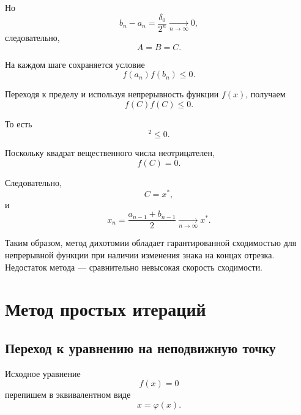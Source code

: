 \documentclass[../final.tex]{subfiles}
\begin{document}
Но
%
\begin{equation*}
    b_n-a_n
    =
    \frac{\delta_0}{2^n}
    \underset{n\to\infty}{\longrightarrow}
    0,
\end{equation*}
%
следовательно,
%
\begin{equation*}
    A=B=C.
\end{equation*}

На каждом шаге сохраняется условие
%
\begin{equation*}
    f(a_n)f(b_n)\leq0.
\end{equation*}

Переходя к пределу и используя непрерывность функции $f(x)$,
получаем
%
\begin{equation*}
    f(C)f(C)\leq0.
\end{equation*}

То есть
%
\begin{equation*}
    [f(C)]^2\leq0.
\end{equation*}

Поскольку квадрат вещественного числа неотрицателен,
%
\begin{equation*}
    f(C)=0.
\end{equation*}

Следовательно,
%
\begin{equation*}
    C=x^*,
\end{equation*}
%
и
%
\begin{equation*}
    x_n
    =
    \frac{a_{n-1}+b_{n-1}}{2}
    \underset{n\to\infty}{\longrightarrow}
    x^*.
\end{equation*}

Таким образом, метод дихотомии обладает гарантированной сходимостью
для непрерывной функции при наличии изменения знака на концах
отрезка. Недостаток метода --- сравнительно невысокая скорость
сходимости.


\section{Метод простых итераций}

\subsection{Переход к уравнению на неподвижную точку}

Исходное уравнение
%
\begin{equation*}
    f(x)=0
\end{equation*}
%
перепишем в эквивалентном виде
%
\begin{equation*}
    x=\varphi(x).
\end{equation*}
\end{document}

